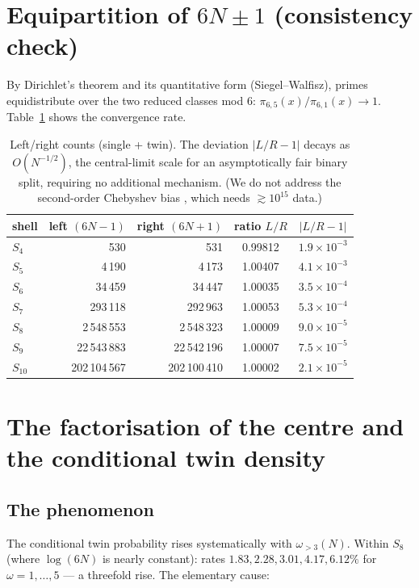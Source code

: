 \documentclass[11pt]{article}
\theoremstyle{definition}
\theoremstyle{remark}
\begin{document}
\section{Equipartition of $6N\pm1$ (consistency check)}

By Dirichlet's theorem and its quantitative form (Siegel--Walfisz), primes
equidistribute over the two reduced classes mod $6$: $\pi_{6,5}(x)/\pi_{6,1}(x)\to1$.
Table~\ref{tab:axial} shows the convergence rate.

\begin{table}[h]\centering
\begin{tabular}{lrrcc}
\toprule
shell & left $(6N{-}1)$ & right $(6N{+}1)$ & ratio $L/R$ & $|L/R-1|$\\
\midrule
$S_4$ & 530 & 531 & 0.99812 & $1.9\times10^{-3}$\\
$S_5$ & 4\,190 & 4\,173 & 1.00407 & $4.1\times10^{-3}$\\
$S_6$ & 34\,459 & 34\,447 & 1.00035 & $3.5\times10^{-4}$\\
$S_7$ & 293\,118 & 292\,963 & 1.00053 & $5.3\times10^{-4}$\\
$S_8$ & 2\,548\,553 & 2\,548\,323 & 1.00009 & $9.0\times10^{-5}$\\
$S_9$ & 22\,543\,883 & 22\,542\,196 & 1.00007 & $7.5\times10^{-5}$\\
$S_{10}$ & 202\,104\,567 & 202\,100\,410 & 1.00002 & $2.1\times10^{-5}$\\
\bottomrule
\end{tabular}
\caption{Left/right counts (single + twin). The deviation $|L/R-1|$ decays as
$O(N^{-1/2})$, the central-limit scale for an asymptotically fair binary split,
requiring no additional mechanism. (We do not address the second-order Chebyshev
bias \cite{RubinsteinSarnak}, which needs $\gtrsim10^{15}$ data.)}
\label{tab:axial}
\end{table}

\section{The factorisation of the centre and the conditional twin density}

\subsection{The phenomenon}
The conditional twin probability rises systematically with $\omega_{>3}(N)$.
Within $S_8$ (where $\log(6N)$ is nearly constant): rates $1.83,2.28,3.01,4.17,
6.12\%$ for $\omega=1,\dots,5$ --- a threefold rise. The elementary cause:
\end{document}
